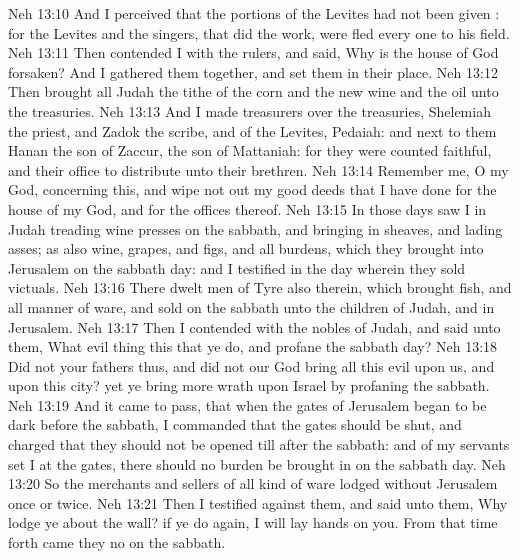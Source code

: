 \vs Neh 13:10 And I perceived that the portions of the Levites had not been given : for the Levites and the singers, that did the work, were fled every one to his field.
\vs Neh 13:11 Then contended I with the rulers, and said, Why is the house of God forsaken? And I gathered them together, and set them in their place.
\vs Neh 13:12 Then brought all Judah the tithe of the corn and the new wine and the oil unto the treasuries.
\vs Neh 13:13 And I made treasurers over the treasuries, Shelemiah the priest, and Zadok the scribe, and of the Levites, Pedaiah: and next to them  Hanan the son of Zaccur, the son of Mattaniah: for they were counted faithful, and their office  to distribute unto their brethren.
\vs Neh 13:14 Remember me, O my God, concerning this, and wipe not out my good deeds that I have done for the house of my God, and for the offices thereof.
\vs Neh 13:15 In those days saw I in Judah  treading wine presses on the sabbath, and bringing in sheaves, and lading asses; as also wine, grapes, and figs, and all  burdens, which they brought into Jerusalem on the sabbath day: and I testified  in the day wherein they sold victuals.
\vs Neh 13:16 There dwelt men of Tyre also therein, which brought fish, and all manner of ware, and sold on the sabbath unto the children of Judah, and in Jerusalem.
\vs Neh 13:17 Then I contended with the nobles of Judah, and said unto them, What evil thing  this that ye do, and profane the sabbath day?
\vs Neh 13:18 Did not your fathers thus, and did not our God bring all this evil upon us, and upon this city? yet ye bring more wrath upon Israel by profaning the sabbath.
\vs Neh 13:19 And it came to pass, that when the gates of Jerusalem began to be dark before the sabbath, I commanded that the gates should be shut, and charged that they should not be opened till after the sabbath: and  of my servants set I at the gates,  there should no burden be brought in on the sabbath day.
\vs Neh 13:20 So the merchants and sellers of all kind of ware lodged without Jerusalem once or twice.
\vs Neh 13:21 Then I testified against them, and said unto them, Why lodge ye about the wall? if ye do  again, I will lay hands on you. From that time forth came they no  on the sabbath.
